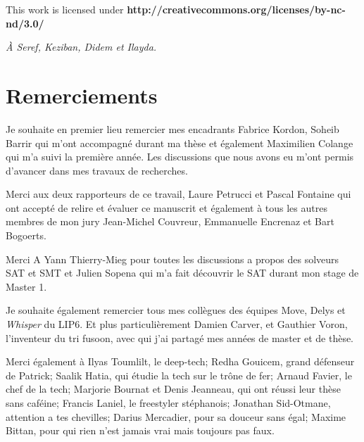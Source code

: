 \clearpage\null\vfill
\thispagestyle{empty}
\begin{minipage}[b]{.9\textwidth}
  \begin{center}
  \setlength{\parskip}{.5\baselineskip}
  {\color{phdcol0}%
   \ccLogo\hspace{.1cm}%
   \ccAttribution\hspace{.1cm}%
   \ccNonCommercial\hspace{.1cm}%
   \ccNoDerivatives}\hspace{.15cm}%
  \footnotesize%
  This work is licensed under {\color{phdcol1}\textbf{http://creativecommons.org/licenses/by-nc-nd/3.0/}}
  \end{center}
\end{minipage}
\vspace*{2\baselineskip}
\clearpage
\thispagestyle{empty}
\begin{flushright}
  \textit{À Seref, Keziban, Didem et Ilayda.}
\end{flushright}
%

\chapter*{Remerciements}

Je souhaite en premier lieu remercier mes encadrants Fabrice Kordon, 
Soheib Barrir qui m'ont accompagné durant ma thèse et également Maximilien Colange
qui m'a suivi la première année.
Les discussions que nous avons eu m'ont permis d'avancer dans mes travaux de recherches.

Merci aux deux rapporteurs de ce travail, 
Laure Petrucci et Pascal Fontaine qui ont accepté de relire et évaluer ce manuscrit et également à 
tous les autres membres de mon jury Jean-Michel Couvreur, Emmanuelle Encrenaz et Bart Bogoerts.


Merci A Yann Thierry-Mieg pour toutes les discussions a propos des solveurs SAT et SMT et 
Julien Sopena  qui m'a fait découvrir le SAT durant mon stage de Master 1.


Je souhaite également remercier tous mes collègues des équipes Move, Delys et \textit{Whisper} du LIP6.
Et plus particulièrement Damien Carver, 
et Gauthier Voron, l'inventeur du tri fusoon,
avec qui j'ai partagé mes années de master et de thèse.


Merci également à Ilyas Toumlilt, le deep-tech;
Redha Gouicem, grand défenseur de Patrick;
Saalik Hatia, qui étudie la tech sur le trône de fer;
Arnaud Favier, le chef de la tech;
Marjorie Bournat et Denis Jeanneau, qui ont réussi leur thèse sans caféine;
Francis Laniel, le freestyler stéphanois;
Jonathan Sid-Otmane, attention a tes chevilles;
Darius Mercadier, pour sa douceur sans égal;
Maxime Bittan, pour qui rien n'est jamais vrai mais toujours pas faux.


